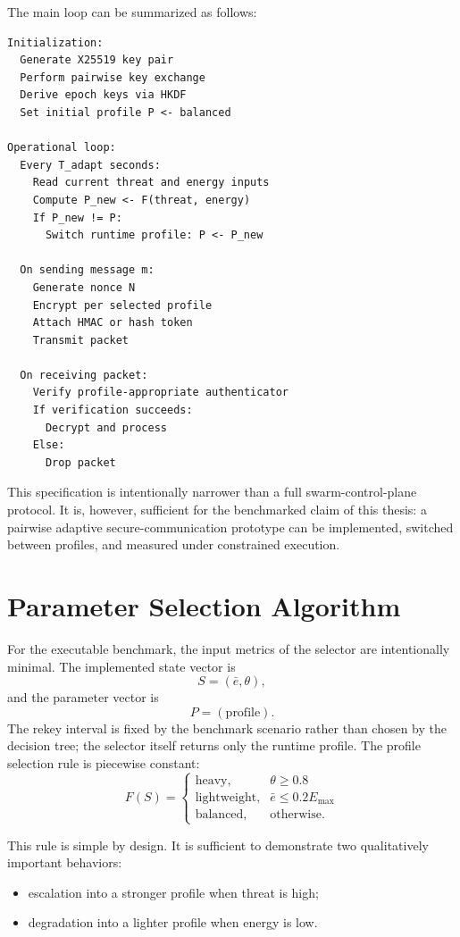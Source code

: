 The main loop can be summarized as follows:

\begin{lstlisting}
Initialization:
  Generate X25519 key pair
  Perform pairwise key exchange
  Derive epoch keys via HKDF
  Set initial profile P <- balanced

Operational loop:
  Every T_adapt seconds:
    Read current threat and energy inputs
    Compute P_new <- F(threat, energy)
    If P_new != P:
      Switch runtime profile: P <- P_new

  On sending message m:
    Generate nonce N
    Encrypt per selected profile
    Attach HMAC or hash token
    Transmit packet

  On receiving packet:
    Verify profile-appropriate authenticator
    If verification succeeds:
      Decrypt and process
    Else:
      Drop packet
\end{lstlisting}

This specification is intentionally narrower than a full swarm-control-plane protocol. It is, however, sufficient for the benchmarked claim of this thesis: a pairwise adaptive secure-communication prototype can be implemented, switched between profiles, and measured under constrained execution.

\section{Parameter Selection Algorithm}
\label{sec:parameter_selection}

For the executable benchmark, the input metrics of the selector are intentionally minimal. The implemented state vector is
\[
S = (\bar{e}, \theta),
\]
and the parameter vector is
\[
P = (\text{profile}).
\]
The rekey interval is fixed by the benchmark scenario rather than chosen by the decision tree; the selector itself returns only the runtime profile.
The profile selection rule is piecewise constant:
\[
F(S) =
\begin{cases}
\text{heavy}, & \theta \geq 0.8 \\
\text{lightweight}, & \bar{e} \leq 0.2E_{\max} \\
\text{balanced}, & \text{otherwise.}
\end{cases}
\]

This rule is simple by design. It is sufficient to demonstrate two qualitatively important behaviors:
\begin{itemize}
  \item escalation into a stronger profile when threat is high;
  \item degradation into a lighter profile when energy is low.
\end{itemize}

